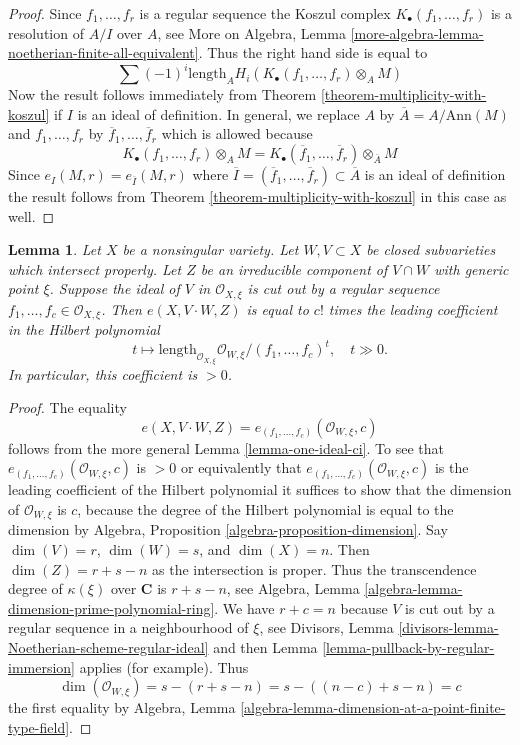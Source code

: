 \documentclass{stacks-project}
\theoremstyle{plain}
\newtheorem{lemma}[subsection]{Lemma}
\theoremstyle{definition}
\theoremstyle{remark}
\numberwithin{equation}{subsection}
\begin{document}
\begin{proof}
Since $f_1, \ldots, f_r$ is a regular sequence the Koszul complex
$K_\bullet(f_1, \ldots, f_r)$ is a resolution of $A/I$ over $A$, see
More on Algebra, Lemma
\ref{more-algebra-lemma-noetherian-finite-all-equivalent}.
Thus the right hand side is equal to
$$
\sum (-1)^i\text{length}_A H_i(K_\bullet(f_1, \ldots, f_r) \otimes_A M)
$$
Now the result follows immediately from
Theorem \ref{theorem-multiplicity-with-koszul} if $I$ is an ideal
of definition. In general, we replace $A$ by $\overline{A} = A/\text{Ann}(M)$
and $f_1, \ldots, f_r$ by $\overline{f}_1, \ldots, \overline{f}_r$
which is allowed because
$$
K_\bullet(f_1, \ldots, f_r) \otimes_A M =
K_\bullet(\overline{f}_1, \ldots, \overline{f}_r) \otimes_{\overline{A}} M
$$
Since $e_I(M, r) = e_{\overline{I}}(M, r)$ where
$\overline{I} = (\overline{f}_1, \ldots, \overline{f}_r) \subset \overline{A}$
is an ideal of definition the result follows from
Theorem \ref{theorem-multiplicity-with-koszul} in this case as well.
\end{proof}

\begin{lemma}
\label{lemma-multiplicity-with-lci}
Let $X$ be a nonsingular variety. Let $W,V \subset X$ be
closed subvarieties which intersect properly. Let $Z$ be an irreducible
component of $V \cap W$ with generic point $\xi$.
Suppose the ideal of $V$ in $\mathcal{O}_{X, \xi}$ is cut out by
a regular sequence $f_1, \ldots, f_c \in \mathcal{O}_{X, \xi}$.
Then $e(X, V\cdot W, Z)$ is equal to $c!$ times the leading coefficient in
the Hilbert polynomial
$$
t \mapsto \text{length}_{\mathcal{O}_{X, \xi}}
\mathcal{O}_{W, \xi}/(f_1, \ldots, f_c)^t,\quad t \gg 0.
$$
In particular, this coefficient is $> 0$.
\end{lemma}

\begin{proof}
The equality
$$
e(X, V\cdot W, Z) = e_{(f_1, \ldots, f_c)}(\mathcal{O}_{W, \xi}, c)
$$
follows from the more general Lemma \ref{lemma-one-ideal-ci}.
To see that $e_{(f_1, \ldots, f_c)}(\mathcal{O}_{W, \xi}, c)$ is
$> 0$ or equivalently that $e_{(f_1, \ldots, f_c)}(\mathcal{O}_{W, \xi}, c)$
is the leading coefficient of the Hilbert polynomial
it suffices to show that the
dimension of $\mathcal{O}_{W, \xi}$ is $c$, because the degree of the
Hilbert polynomial is equal to the dimension by
Algebra, Proposition \ref{algebra-proposition-dimension}.
Say $\dim(V) = r$, $\dim(W) = s$, and $\dim(X) = n$. Then
$\dim(Z) = r + s - n$ as the intersection is proper. Thus
the transcendence degree of $\kappa(\xi)$ over $\mathbf{C}$ is
$r + s - n$, see Algebra, Lemma
\ref{algebra-lemma-dimension-prime-polynomial-ring}.
We have $r + c = n$ because $V$ is cut out by a regular sequence
in a neighbourhood of $\xi$, see
Divisors, Lemma \ref{divisors-lemma-Noetherian-scheme-regular-ideal}
and then Lemma \ref{lemma-pullback-by-regular-immersion}
applies (for example). Thus
$$
\dim(\mathcal{O}_{W, \xi}) = s - (r + s - n) = s - ((n - c) + s - n) = c
$$
the first equality by Algebra, Lemma
\ref{algebra-lemma-dimension-at-a-point-finite-type-field}.
\end{proof}
\end{document}
